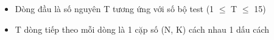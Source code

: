 \begin{itemize}
	\item     Dòng đầu là số nguyên T tương ứng với số bộ test (1  $\le$  T  $\le$  15)   
	\item     T dòng tiếp theo mỗi dòng là 1 cặp số (N, K) cách nhau 1 dấu cách   
\end{itemize}

\